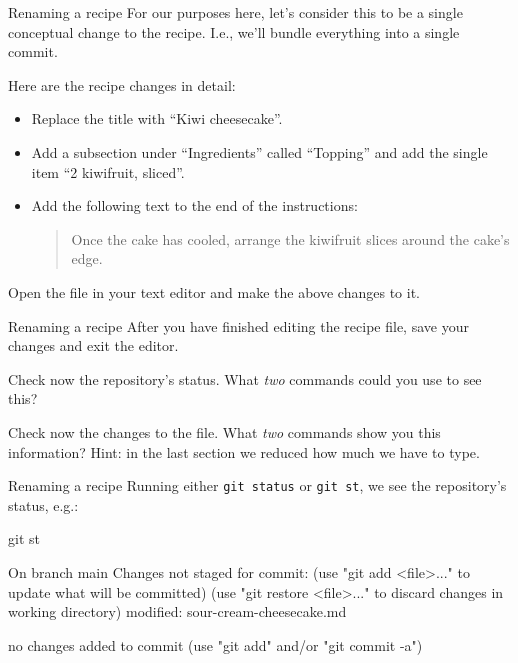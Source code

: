 \documentclass{git_course}
\begin{document}
\begin{frame}[fragile]{Renaming a recipe}
    For our purposes here, let's consider this to be a single conceptual
    change to the recipe.  I.e., we'll bundle everything into a single
    commit.

    Here are the recipe changes in detail:
    \begin{itemize}
        \item Replace the title with ``Kiwi cheesecake''.
        \item Add a subsection under ``Ingredients'' called ``Topping'' and
            add the single item ``2 kiwifruit, sliced''.
        \item Add the following text to the end of the instructions:
            \begin{quote}
                Once the cake has cooled, arrange the kiwifruit slices around the cake's edge.
            \end{quote}
    \end{itemize}

    Open the file  in your text
    editor and make the above changes to it.
\end{frame}

\begin{frame}[fragile]{Renaming a recipe}
    After you have finished editing the recipe file, save your changes and
    exit the editor.

    Check now the repository's status.  What \emph{two} commands could you
    use to see this?

    Check now the changes to the file.  What \emph{two} commands show you
    this information?  Hint: in the last section we reduced how much we have
    to type.
\end{frame}

\begin{frame}[fragile]{Renaming a recipe}
    Running either \texttt{git status} or \texttt{git st},
    we see the repository's status, e.g.:

    \begin{shellcode}
        git st
    \end{shellcode}
    \begin{outputcode}
On branch main
Changes not staged for commit:
  (use "git add <file>..." to update what will be committed)
  (use "git restore <file>..." to discard changes in working directory)
        modified:   sour-cream-cheesecake.md

no changes added to commit (use "git add" and/or "git commit -a")
    \end{outputcode}
\end{frame}
\end{document}
